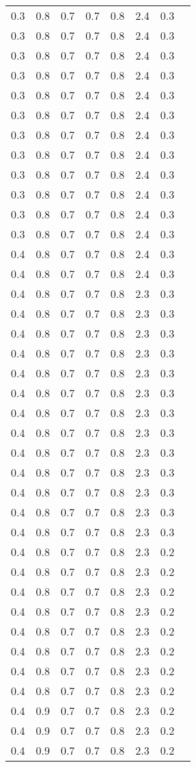 \begin{tabular}{L{1in}|L{1in}|L{1in}|L{1in}|L{1in}|L{1in}|L{1in}|L{1in}}
0.3&0.8&0.7&0.7&0.8&2.4&0.3\\
0.3&0.8&0.7&0.7&0.8&2.4&0.3\\
0.3&0.8&0.7&0.7&0.8&2.4&0.3\\
0.3&0.8&0.7&0.7&0.8&2.4&0.3\\
0.3&0.8&0.7&0.7&0.8&2.4&0.3\\
0.3&0.8&0.7&0.7&0.8&2.4&0.3\\
0.3&0.8&0.7&0.7&0.8&2.4&0.3\\
0.3&0.8&0.7&0.7&0.8&2.4&0.3\\
0.3&0.8&0.7&0.7&0.8&2.4&0.3\\
0.3&0.8&0.7&0.7&0.8&2.4&0.3\\
0.3&0.8&0.7&0.7&0.8&2.4&0.3\\
0.3&0.8&0.7&0.7&0.8&2.4&0.3\\
0.4&0.8&0.7&0.7&0.8&2.4&0.3\\
0.4&0.8&0.7&0.7&0.8&2.4&0.3\\
0.4&0.8&0.7&0.7&0.8&2.3&0.3\\
0.4&0.8&0.7&0.7&0.8&2.3&0.3\\
0.4&0.8&0.7&0.7&0.8&2.3&0.3\\
0.4&0.8&0.7&0.7&0.8&2.3&0.3\\
0.4&0.8&0.7&0.7&0.8&2.3&0.3\\
0.4&0.8&0.7&0.7&0.8&2.3&0.3\\
0.4&0.8&0.7&0.7&0.8&2.3&0.3\\
0.4&0.8&0.7&0.7&0.8&2.3&0.3\\
0.4&0.8&0.7&0.7&0.8&2.3&0.3\\
0.4&0.8&0.7&0.7&0.8&2.3&0.3\\
0.4&0.8&0.7&0.7&0.8&2.3&0.3\\
0.4&0.8&0.7&0.7&0.8&2.3&0.3\\
0.4&0.8&0.7&0.7&0.8&2.3&0.3\\
0.4&0.8&0.7&0.7&0.8&2.3&0.2\\
0.4&0.8&0.7&0.7&0.8&2.3&0.2\\
0.4&0.8&0.7&0.7&0.8&2.3&0.2\\
0.4&0.8&0.7&0.7&0.8&2.3&0.2\\
0.4&0.8&0.7&0.7&0.8&2.3&0.2\\
0.4&0.8&0.7&0.7&0.8&2.3&0.2\\
0.4&0.8&0.7&0.7&0.8&2.3&0.2\\
0.4&0.8&0.7&0.7&0.8&2.3&0.2\\
0.4&0.9&0.7&0.7&0.8&2.3&0.2\\
0.4&0.9&0.7&0.7&0.8&2.3&0.2\\
0.4&0.9&0.7&0.7&0.8&2.3&0.2\\

\end{tabular}
